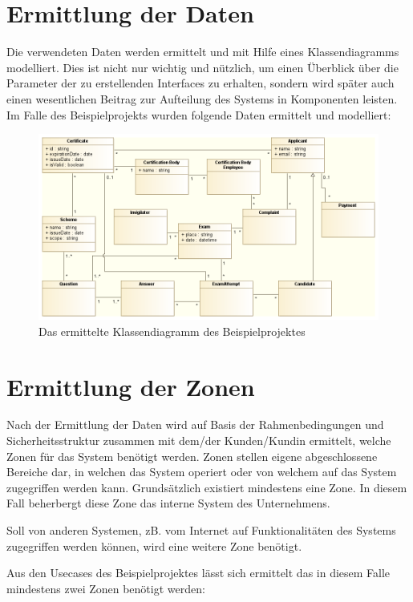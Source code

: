 \section{Ermittlung der Daten}
Die verwendeten Daten werden ermittelt und mit Hilfe eines Klassendiagramms modelliert. Dies ist nicht nur wichtig und nützlich, um einen Überblick über die Parameter der zu erstellenden Interfaces zu erhalten, sondern wird später auch einen wesentlichen Beitrag zur Aufteilung des Systems in Komponenten leisten. Im Falle des Beispielprojekts wurden folgende Daten ermittelt und modelliert:

\begin{figure}[H]
    \centering
    \includegraphics[scale=0.5]{uml/class.png}
    \caption{Das ermittelte Klassendiagramm des Beispielprojektes}
\end{figure}

\section{Ermittlung der Zonen}
Nach der Ermittlung der Daten wird auf Basis der Rahmenbedingungen und Sicherheitsstruktur zusammen mit dem/der Kunden/Kundin ermittelt, welche Zonen für das System benötigt werden. Zonen stellen eigene abgeschlossene Bereiche dar, in welchen das System operiert oder von welchem auf das System zugegriffen werden kann. Grundsätzlich existiert mindestens eine Zone. In diesem Fall beherbergt diese Zone das interne System des Unternehmens.

Soll von anderen Systemen, zB. vom Internet auf Funktionalitäten des Systems zugegriffen werden können, wird eine weitere Zone benötigt.

Aus den Usecases des Beispielprojektes lässt sich ermittelt das in diesem Falle mindestens zwei Zonen benötigt werden:

